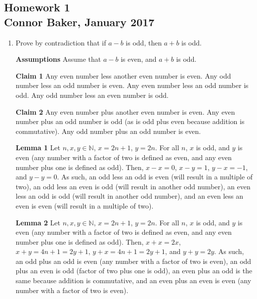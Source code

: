 \documentclass[12pt]{article}
\begin{document}
\begin{center}
\subsection*{Homework 1\\Connor Baker, January 2017}
\end{center}

\begin{enumerate}
\item Prove by contradiction that if $a-b$ is odd, then $a+b$ is odd.
\end{enumerate}

\begin{enumerate}
  \item[\textbf{Assumptions}] Assume that $a-b$ is even, and $a+b$ is odd.
\end{enumerate}

\begin{enumerate}
  \item[\textbf{Claim 1}] Any even number less another even number is even. Any odd number less an odd number is even. Any even number less an odd number is odd. Any odd number less an even number is odd.
  \item[\textbf{Claim 2}] Any even number plus another even number is even. Any even number plus an odd number is odd (as is odd plus even because addition is commutative). Any odd number plus an odd number is even.
\end{enumerate}

\begin{enumerate}
  \item[\textbf{Lemma 1}] Let $n,x,y \in\mathbb{N}$, $x=2n+1$, $y=2n$. For all $n$, $x$ is odd, and $y$ is even (any number with a factor of two is defined as even, and any even number plus one is defined as odd). Then, $x-x=0$, $x-y=1$, $y-x=-1$, and $y-y=0$. As such, an odd less an odd is even (will result in a multiple of two), an odd less an even is odd (will result in another odd number), an even less an odd is odd (will result in another odd number), and an even less an even is even (will result in a multiple of two).
  \item[\textbf{Lemma 2}] Let $n,x,y \in\mathbb{N}$, $x=2n+1$, $y=2n$. For all $n$, $x$ is odd, and $y$ is even (any number with a factor of two is defined as even, and any even number plus one is defined as odd). Then, $x+x=2x$, $x+y=4n+1=2y+1$, $y+x=4n+1=2y+1$, and $y+y=2y$. As such, an odd plus an odd is even (any number with a factor of two is even), an odd plus an even is odd (factor of two plus one is odd), an even plus an odd is the same because addition is commutative, and an even plus an even is even (any number with a factor of two is even).
\end{enumerate}
\end{document}
